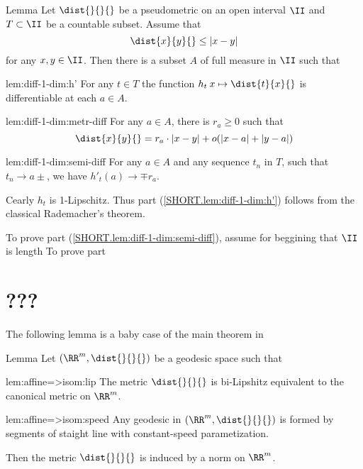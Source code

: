 \begin{thm}{Lemma}\label{lem:diff-1-dim}
Let $\dist{}{}{}$ be a pseudometric on an open interval $\II$ and $T\subset\II$ be a countable subset.
Assume that 
\[\dist{x}{y}{}\le|x-y|\]
for any $x,y\in\II$.
Then there is a subset $A$ of full measure in $\II$ such that 

\begin{subthm}{lem:diff-1-dim:h'}
For any $t\in T$ the function $h_t\:x\mapsto\dist{t}{x}{}$ is differentiable at each $a\in A$.
\end{subthm}

\begin{subthm}{lem:diff-1-dim:metr-diff}
For any $a\in A$, there is $r_a\ge0$ such that
\[\dist{x}{y}{}=r_a\cdot|x-y|+o(|x-a|+|y-a|)\] 
\end{subthm}

\begin{subthm}{lem:diff-1-dim:semi-diff}
For any $a\in A$ and any sequence $t_n$ in $T$, such that $t_n\to a\pm$,
we have $h'_t(a)\to\mp r_a$.
\end{subthm}
\end{thm}

Cearly $h_t$ is 1-Lipschitz.
Thus part (\ref{SHORT.lem:diff-1-dim:h'}) follows from the classical Rademacher's theorem.

To prove part (\ref{SHORT.lem:diff-1-dim:semi-diff}),
assume for beggining that $\II$ is length  
To prove part 
\qeds

\section{???}

The following lemma is a baby case of the main theorem in \cite{hitzelberger-lytchak}

\begin{thm}{Lemma}\label{lem:affine=>isom}
Let $(\RR^m,\dist{}{}{})$ be a geodesic space such that 
\begin{subthm}{lem:affine=>isom:lip}
The metric $\dist{}{}{}$ is bi-Lipshitz equivalent to the canonical metric on $\RR^m$. 
\end{subthm}
\begin{subthm}{lem:affine=>isom:speed}
Any geodesic in $(\RR^m,\dist{}{}{})$ is formed by segments of 
staight line with constant-speed parametization.
\end{subthm}
Then the metric $\dist{}{}{}$ is induced by a norm on $\RR^m$.
\end{thm}


